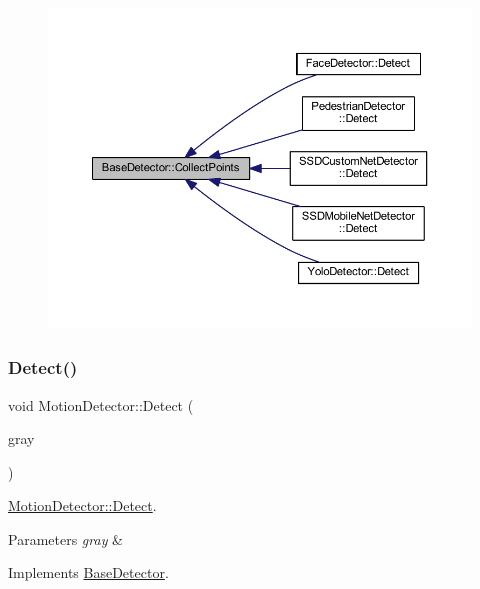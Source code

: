 \begin{figure}[H]
\begin{center}
\leavevmode
\includegraphics[width=350pt]{class_base_detector_a20380b0980c6f262b0829f37fb89d2a7_icgraph}
\end{center}
\end{figure}
\mbox{\label{class_motion_detector_aac68875ab09d4436391855e2df4e0e06}} 
\subsubsection{\texorpdfstring{Detect()}{Detect()}}
{\footnotesize\ttfamily void Motion\+Detector\+::\+Detect (\begin{DoxyParamCaption}\item[{cv\+::\+U\+Mat \&}]{gray }\end{DoxyParamCaption})\hspace{0.3cm}{\ttfamily [virtual]}}



\mbox{\hyperlink{class_motion_detector_aac68875ab09d4436391855e2df4e0e06}{Motion\+Detector\+::\+Detect}}. 


\begin{DoxyParams}{Parameters}
{\em gray} & \\
\hline
\end{DoxyParams}


Implements \mbox{\hyperlink{class_base_detector_a9c9dedfffb7673fd2995f24bdb9ade18}{Base\+Detector}}.



